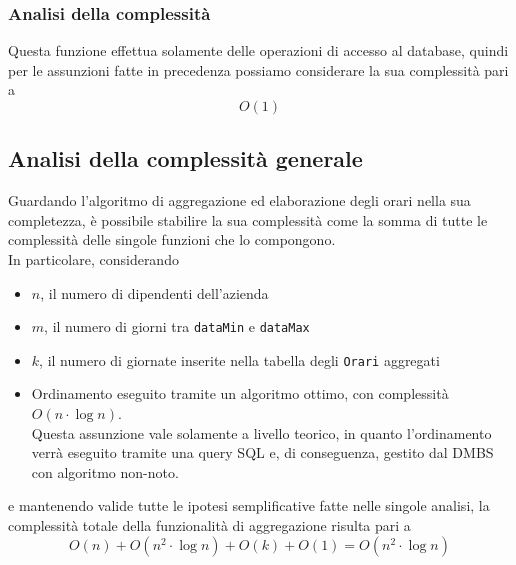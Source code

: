 

\subsubsection{Analisi della complessità}
Questa funzione effettua solamente delle operazioni di accesso al database, quindi per le assunzioni fatte in precedenza possiamo considerare la sua complessità pari a
\begin{equation}
	O(1)
\end{equation}
\subsection{Analisi della complessità generale}
Guardando l'algoritmo di aggregazione ed elaborazione degli orari nella sua completezza, è possibile stabilire la sua complessità come la somma di tutte le complessità delle singole funzioni che lo compongono.\\
In particolare, considerando
\begin{itemize}
	\item $n$, il numero di dipendenti dell'azienda
	\item $m$, il numero di giorni tra \verb|dataMin| e \verb|dataMax|
	\item $k$, il numero di giornate inserite nella tabella degli \verb|Orari| aggregati
	\item Ordinamento eseguito tramite un algoritmo ottimo, con complessità $O(n\cdot \log{n})$.\\
		Questa assunzione vale solamente a livello teorico, in quanto l'ordinamento verrà eseguito tramite una query SQL e, di conseguenza, gestito dal DMBS con algoritmo non-noto.
\end{itemize}
e mantenendo valide tutte le ipotesi semplificative fatte nelle singole analisi, la complessità totale della funzionalità di aggregazione risulta pari a
\begin{equation}
	O(n) + O(n^2 \cdot \log{n}) + O(k) + O(1) = O(n^2 \cdot \log{n})
\end{equation}

